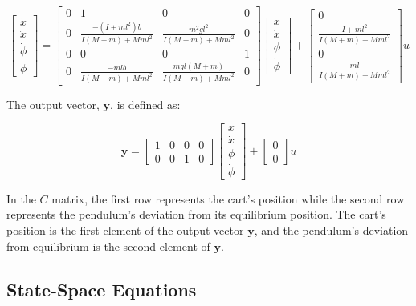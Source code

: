 \documentclass[11pt,twocolumn,twoside,lineno]{pnas-new}
\begin{document}
\begin{equation}
\begin{bmatrix}
\dot{x}\\ 
\ddot{x}\\ 
\dot{\phi}\\ 
\ddot{\phi}
\end{bmatrix} 
=
\begin{bmatrix}
0&1&0&0\\
0&\frac{-(I+ml^2)b}{I(M+m)+Mml^2}&\frac{m^2gl^2}{I(M+m)+Mml^2}&0\\
0&0&0&1\\
0&\frac{-mlb}{I(M+m)+Mml^2}&\frac{mgl(M+m)}{I(M+m)+Mml^2}&0
\end{bmatrix}
\begin{bmatrix}
x\\ 
\dot{x}\\ 
\phi\\ 
\dot{\phi}
\end{bmatrix}
+
\begin{bmatrix}
0\\
\frac{I+ml^2}{I(M+m)+Mml^2}\\
0\\
\frac{ml}{I(M+m)+Mml^2}
\end{bmatrix}
u
\end{equation}

The output vector, $\mathbf{y}$, is defined as:

\begin{equation}
\mathbf{y} =
\begin{bmatrix}
1&0&0&0\\
0&0&1&0
\end{bmatrix}
\begin{bmatrix}
x\\ 
\dot{x}\\ 
\phi\\ 
\dot{\phi}
\end{bmatrix}
+
\begin{bmatrix}
0\\
0
\end{bmatrix}
u
\end{equation}

In the $C$ matrix, the first row represents the cart's position while the second row represents the pendulum's deviation from its equilibrium position. The cart's position is the first element of the output vector $\mathbf{y}$, and the pendulum's deviation from equilibrium is the second element of $\mathbf{y}$.


\subsection{State-Space Equations}
\end{document}
